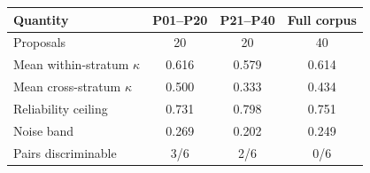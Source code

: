 \begin{tabular}{lccc}
\toprule
Quantity & P01--P20 & P21--P40 & Full corpus \\
\midrule
Proposals & 20 & 20 & 40 \\
Mean within-stratum $\kappa$ & 0.616 & 0.579 & 0.614 \\
Mean cross-stratum $\kappa$ & 0.500 & 0.333 & 0.434 \\
Reliability ceiling & 0.731 & 0.798 & 0.751 \\
Noise band & 0.269 & 0.202 & 0.249 \\
Pairs discriminable & 3/6 & 2/6 & 0/6 \\
\bottomrule
\end{tabular}